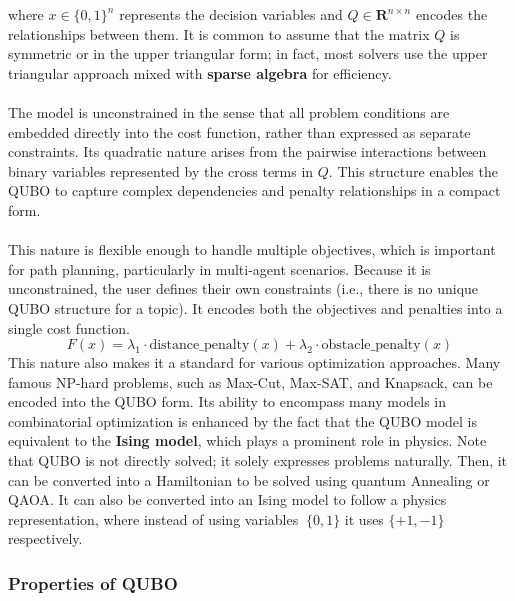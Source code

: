 \documentclass[11pt]{article}
\begin{document}
where 
\( x\in\{0,1\}^n \) represents the decision variables and 
\( Q\in\mathbf{R}^{n\times n} \) encodes the relationships between them. It is common to assume that the matrix \(Q\) is symmetric or in the upper triangular form; in fact, most solvers use the upper triangular approach mixed with \textbf{sparse algebra} for efficiency.\\
\\
The model is unconstrained in the sense that all problem conditions are embedded directly into the cost function, rather than expressed as separate constraints. Its quadratic nature arises from the pairwise interactions between binary variables represented by the cross terms in 
\(Q\). This structure enables the QUBO to capture complex dependencies and penalty relationships in a compact form.\\
\\
This nature is flexible enough to handle multiple objectives, which is important for path planning, particularly in multi-agent scenarios. Because it is unconstrained, the user defines their own constraints (i.e., there is no unique QUBO structure for a topic). It encodes both the objectives and penalties into a single cost function. 
\[
F(x)= \lambda_1\cdot\text{distance\_penalty}(x)+\lambda_2\cdot\text{obstacle\_penalty}(x)
\]
This nature also makes it a standard for various optimization approaches. Many famous NP-hard problems, such as Max-Cut, Max-SAT, and Knapsack, can be encoded into the QUBO form. Its ability to encompass many models in combinatorial optimization is enhanced by the fact that the QUBO model is equivalent to the \textbf{Ising model}, which plays a prominent role in physics.
Note that QUBO is not directly solved; it solely expresses problems naturally. Then, it can be converted into a Hamiltonian to be solved using quantum Annealing or QAOA. It can also be converted into an Ising model to follow a physics representation, where instead of using variables \(\ \{0,1\}\) it uses \( \{+1,-1\} \) respectively.

\subsubsection{Properties of QUBO}
\end{document}

